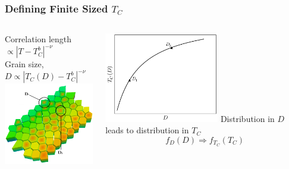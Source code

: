 \documentclass{beamer}
\begin{document}
\begin{frame}
	\frametitle{Defining Finite Sized $T_C$}
	\begin{columns}
		\column{6cm}
		\begin{center}
		Correlation length $\propto |T-T_C^b|^{-\nu}$ \\ \vspace{3mm}
		Grain size, $D \propto |T_C(D)-T_C^b|^{-\nu}$ \\ \vspace{3mm}
		\includegraphics[width=5cm]{Images/grains2}
		\end{center}
		\column{6cm}
		\begin{center}
		\includegraphics[width=5cm]{Images/TcD}
		\vspace{4mm}
		Distribution in $D$ leads to distribution in $T_C$
		$$
		f_D(D) \Longrightarrow f_{T_C}(T_C)
		$$
		\end{center}
	\end{columns}
\end{frame}
\end{document}
